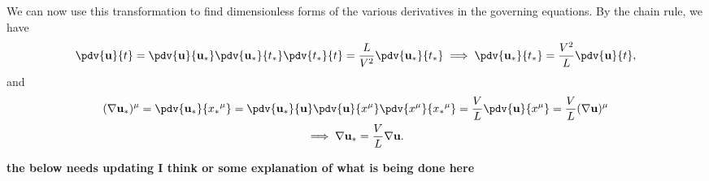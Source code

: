We can now use this transformation to find dimensionless forms of the various derivatives in the governing equations. By the chain rule, we have
\begin{equation}
    \pdv{\mathbf{u}}{t} = \pdv{\mathbf{u}}{\mathbf{u_*}} \pdv{\mathbf{u_*}}{t_*} \pdv{t_*}{t} = \frac{L}{V^2} \pdv{\mathbf{u_*}}{t_*} \implies \pdv{\mathbf{u_*}}{t_*} = \frac{V^2}{L} \pdv{\mathbf{u}}{t},
\label{dut*}
\end{equation}
and
\begin{gather}
    (\nabla \mathbf{u_*})^\mu = \pdv{\mathbf{u_*}}{{x_*}^\mu} = \pdv{\mathbf{u_*}}{\mathbf{u}} \pdv{\mathbf{u}}{x^\mu} \pdv{x^\mu}{{x_*}^\mu} = \frac{V}{L} \pdv{\mathbf{u}}{x^\mu} = \frac{V}{L} (\nabla \mathbf{u})^\mu \nonumber\\
    \implies \nabla \mathbf{u_*} = \frac{V}{L} \nabla \mathbf{u}.
\label{gradu*}
\end{gather}

\textbf{the below needs updating I think or some explanation of what is being done here}

